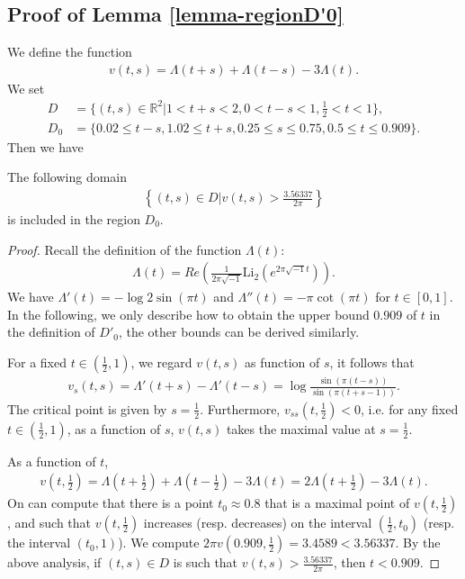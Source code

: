 \documentclass[12pt]{amsart}
\begin{document}
\subsection{Proof of Lemma \ref{lemma-regionD'0}}   \label{appendix-0}
We define the function
\begin{align}
    v(t,s)=\Lambda(t+s)+\Lambda(t-s)-3\Lambda\left(t\right).
\end{align}
We set
    \begin{align}
    D&=\{(t,s)\in \mathbb{R}^2| 1< t+s< 2, 0< t-s<1, \frac{1}{2}< t<1\}, \\\nonumber
    D_0&=\{0.02 \leq t-s, 1.02 \leq t+s, 0.25 \leq s\leq 0.75,0.5\leq t\leq 0.909\}.
\end{align}
Then we have
\begin{lemma} 
The following domain
    \begin{align} 
        \left\{(t,s)\in D| v(t,s)>\frac{3.56337}{2\pi}\right\}
    \end{align}
    is included in the region $D_0$.
\end{lemma}
\begin{proof}
Recall the definition of the function $\Lambda(t)$:
\begin{align}
  \Lambda(t)=Re\left(\frac{1}{2\pi\sqrt{-1}}\text{Li}_2(e^{2\pi\sqrt{-1}t})\right). 
\end{align}
We have $\Lambda'(t)=-\log 2\sin(\pi t)$ and $\Lambda''(t)=-\pi \cot(\pi t)$ for $t\in [0,1]$. In the following, we only describe how to obtain the upper bound 0.909 of $t$ in the definition of $D'_0$, the other bounds can be derived similarly.   

For a fixed $t\in (\frac{1}{2},1)$, we regard $v(t,s)$ as function of $s$, it follows that 
\begin{align}
    v_s(t,s)=\Lambda'(t+s)-\Lambda'(t-s)=\log\frac{\sin(\pi(t-s))}{\sin(\pi(t+s-1))}. 
\end{align}
The critical point is given by $s=\frac{1}{2}$. Furthermore, $v_{ss}(t,\frac{1}{2})<0$, i.e. for any fixed $t\in (\frac{1}{2},1)$, 
as a function of $s$, $v(t,s)$ takes the maximal value at $s=\frac{1}{2}$.  

As a function of $t$, 
\begin{align}
    v(t,\frac{1}{2})=\Lambda(t+\frac{1}{2})+\Lambda(t-\frac{1}{2})-3\Lambda(t)=2\Lambda(t+\frac{1}{2})-3\Lambda(t).
\end{align}
On can compute that there is a point $t_0\approx 0.8$ that is a maximal point of $v(t,\frac{1}{2})$, and such that $v(t,\frac{1}{2})$ increases (resp. decreases) on the interval $(\frac{1}{2},t_0)$ (resp. the interval $(t_0,1)$). 
We compute
$2\pi v(0.909,\frac{1}{2})=3.4589<3.56337$. By the above analysis, if $(t,s)\in D$ is such that $v(t,s)>\frac{3.56337}{2\pi }$, then $t<0.909$. 
\end{proof}
\end{document}

